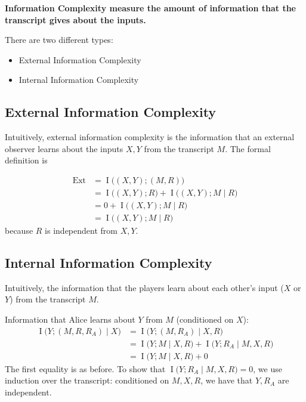 \documentclass{article}
\begin{document}
\textbf{Information Complexity measure the amount of information that the transcript gives about the inputs.}

There are two different types:
\begin{itemize}
    \item External Information Complexity
    \item Internal Information Complexity
\end{itemize}

\subsection{External Information Complexity}

Intuitively, external information complexity is the information that an external observer learns about the inputs $X,Y$ from the transcript $M$. The formal definition is 

\begin{align*}
    \text{Ext} &= \operatorname{I}\big(\left(X,Y\right); \left(M,R\right)\big)\\
    &= \operatorname{I}\big(\left(X,Y\right); R\big) + \operatorname{I}\big(\left(X,Y\right); M\mid R\big)\\
    &= 0 + \operatorname{I}\big(\left(X,Y\right); M\mid R\big)\\
    &= \operatorname{I}\big(\left(X,Y\right); M\mid R\big)
\end{align*}
because $R$ is independent from $X,Y$.

\subsection{Internal Information Complexity}

Intuitively, the information that the players learn about each other's input ($X$ or $Y$) from the transcript $M$.

Information that Alice learns about $Y$ from $M$ (conditioned on $X$):
\begin{align*}
    \operatorname{I}\big(Y; \left(M,R,R_A\right)\mid X\big) &= \operatorname{I}\big(Y; \left(M,R_A\right)\mid X, R)\\
    &= \operatorname{I}\big(Y; M\mid X,R\big) + \operatorname{I}\big(Y; R_A\mid M,X,R\big)\\
    &= \operatorname{I}\big(Y; M\mid X,R\big) + 0
\end{align*}
The first equality is as before. To show that $\operatorname{I}\big(Y; R_A\mid M,X,R\big)=0$, we use induction over the transcript: conditioned on $M,X,R$, we have that $Y,R_A$ are independent.
\end{document}
